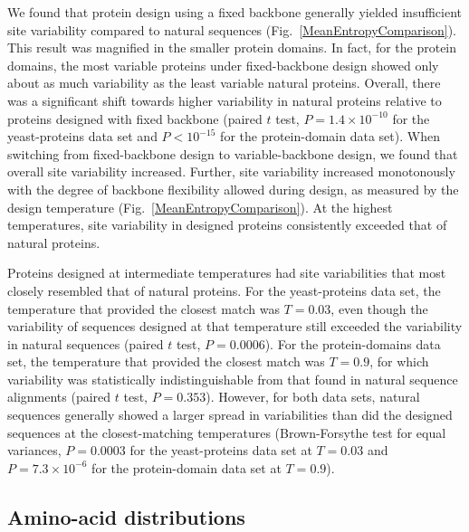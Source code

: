 \documentclass[12pt]{article}
\begin{document}
We found that protein design using a fixed backbone generally yielded insufficient site variability compared to natural sequences (Fig.~\ref{MeanEntropyComparison}).  This result was magnified in the smaller protein domains. In fact, for the protein domains, the most variable proteins under fixed-backbone design showed only about as much variability as the least variable natural proteins. Overall, there was a significant shift towards higher variability in natural proteins relative to proteins designed with fixed backbone (paired $t$ test, $P = 1.4\times10^{-10}$ for the yeast-proteins data set and $P<10^{-15}$ for the protein-domain data set). When switching from fixed-backbone design to variable-backbone design, we found that overall site variability increased. Further, site variability increased monotonously with the degree of backbone flexibility allowed during design, as measured by the design temperature (Fig.~\ref{MeanEntropyComparison}). At the highest temperatures, site variability in designed proteins consistently exceeded that of natural proteins. 

Proteins designed at intermediate temperatures had site variabilities that most closely resembled that of natural proteins. For the yeast-proteins data set, the temperature that provided the closest match was $T=0.03$, even though the variability of sequences designed at that temperature still exceeded the variability in natural sequences (paired $t$ test, $P= 0.0006$). For the protein-domains data set, the temperature that provided the closest match was $T=0.9$, for which variability was statistically indistinguishable from that found in natural sequence alignments (paired $t$ test, $P= 0.353$). However, for both data sets, natural sequences generally showed a larger spread in variabilities than did the designed sequences at the closest-matching temperatures (Brown-Forsythe test for equal variances, $P= 0.0003$ for the yeast-proteins data set at $T = 0.03$  and $P= 7.3\times 10^{-6}$ for the protein-domain data set at $T = 0.9$).

\subsection{Amino-acid distributions}
\label{AminoAcidDistributions}
\end{document}
